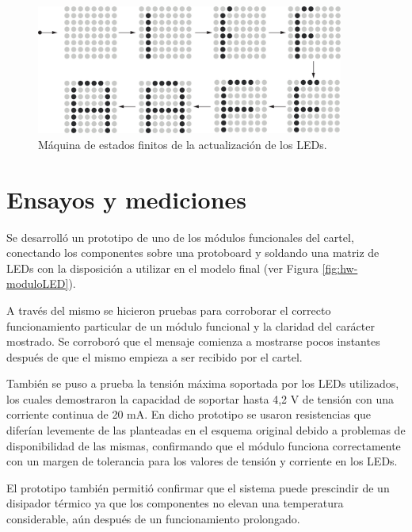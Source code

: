 \begin{figure}[ht!]
	\begin{center}
		\centering
		\includegraphics[width=0.9\textwidth]{imagenes/hw/estadosRefresh.pdf}
		\caption{Máquina de estados finitos de la actualización de los LEDs.}
		\label{fig:fsm-matriz}
	\end{center}
\end{figure}

\section{Ensayos y mediciones}
Se desarrolló un prototipo de uno de los módulos funcionales del cartel, conectando los componentes sobre una protoboard y soldando una matriz de LEDs con la disposición a utilizar en el modelo final (ver Figura \ref{fig:hw-moduloLED}).

A través del mismo se hicieron pruebas para corroborar el correcto funcionamiento particular de un módulo funcional y la claridad del carácter mostrado. Se corroboró que el mensaje comienza a mostrarse pocos instantes después de que el mismo empieza a ser recibido por el cartel.

También se puso a prueba la tensión máxima soportada por los LEDs utilizados, los cuales demostraron la capacidad de soportar hasta 4,2 V de tensión con una corriente continua de 20 mA. En dicho prototipo se usaron resistencias que diferían levemente de las planteadas en el esquema original debido a problemas de disponibilidad de las mismas, confirmando que el módulo funciona correctamente con un margen de tolerancia para los valores de tensión y corriente en los LEDs.

El prototipo también permitió confirmar que el sistema puede prescindir de un disipador térmico ya que los componentes no elevan una temperatura considerable, aún después de un funcionamiento prolongado.


